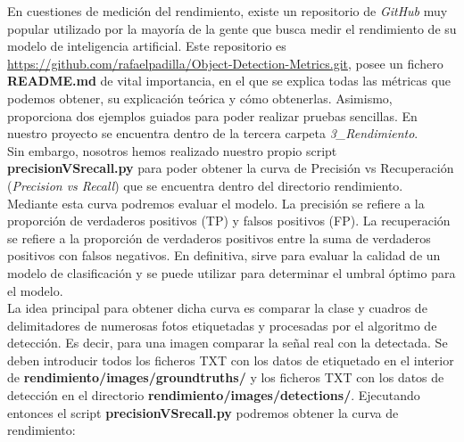 En cuestiones de medición del rendimiento, existe un repositorio de \textit{GitHub} muy popular utilizado por la mayoría de la gente que busca medir el rendimiento de su modelo de inteligencia artificial. Este repositorio es \url{https://github.com/rafaelpadilla/Object-Detection-Metrics.git}, posee un fichero \textbf{README.md} de vital importancia, en el que se explica todas las métricas que podemos obtener, su explicación teórica y cómo obtenerlas. Asimismo, proporciona dos ejemplos guiados para poder realizar pruebas sencillas. En nuestro proyecto se encuentra dentro de la tercera carpeta \textit{3_Rendimiento}.\\

Sin embargo, nosotros hemos realizado nuestro propio script \textbf{precisionVSrecall.py} para poder obtener la curva de Precisión vs Recuperación (\textit{Precision vs Recall}) que se encuentra dentro del directorio rendimiento. Mediante esta curva podremos evaluar el modelo. La precisión se refiere a la proporción de verdaderos positivos (TP) y falsos positivos (FP). La recuperación se refiere a la proporción de verdaderos positivos entre la suma de verdaderos positivos con falsos negativos. En definitiva, sirve para evaluar la calidad de un modelo de clasificación y se puede utilizar para determinar el umbral óptimo para el modelo.\\

La idea principal para obtener dicha curva es comparar la clase y cuadros de delimitadores de numerosas fotos etiquetadas y procesadas por el algoritmo de detección. Es decir, para una imagen comparar la señal real con la detectada. Se deben introducir todos los ficheros TXT con los datos de etiquetado en el interior de \textbf{rendimiento/images/groundtruths/} y los ficheros TXT con los datos de detección en el directorio \textbf{rendimiento/images/detections/}. Ejecutando entonces el script \textbf{precisionVSrecall.py} podremos obtener la curva de rendimiento:
